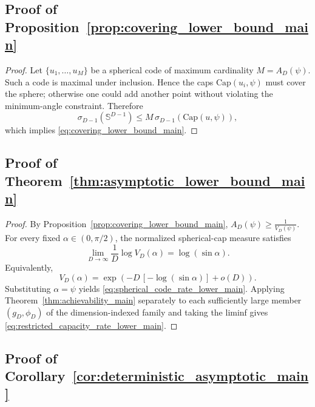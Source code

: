 \documentclass[journal]{IEEEtran}
\begin{document}
\begin{bibunit}
\subsection{Proof of Proposition~\ref{prop:covering_lower_bound_main}}
\label{app:proof_prop_covering_lower_bound}

\begin{proof}
%
Let $\{u_1,\ldots,u_M\}$ be a spherical code of maximum cardinality $M=A_D(\psi)$. Such a code is maximal under inclusion. Hence the caps $\mathrm{Cap}(u_i,\psi)$ must cover the sphere; otherwise one could add another point without violating the minimum-angle constraint. Therefore
\[
\sigma_{D-1}(\mathbb{S}^{D-1}) \le M\,\sigma_{D-1}(\mathrm{Cap}(u,\psi)),
\]
which implies \eqref{eq:covering_lower_bound_main}.
%
\end{proof}







\subsection{Proof of Theorem~\ref{thm:asymptotic_lower_bound_main}}
\label{app:proof_thm_asymptotic_lower_bound}


\begin{proof}
% 
By Proposition~\ref{prop:covering_lower_bound_main}, $A_D(\psi)\ge \frac{1}{V_D(\psi)}$. For every fixed $\alpha\in(0,\pi/2)$, the normalized spherical-cap measure satisfies
%
\begin{equation}
\lim_{D\to\infty}\frac{1}{D}\log V_D(\alpha)=\log(\sin\alpha).
\end{equation}
%
Equivalently,
%
\begin{equation}
V_D(\alpha) = \exp \left( -D\,[-\log(\sin\alpha)] + o(D) \right).
\end{equation}
%
Substituting $\alpha=\psi$ yields \eqref{eq:spherical_code_rate_lower_main}. Applying Theorem~\ref{thm:achievability_main} separately to each sufficiently large member $(g_D,\phi_D)$ of the dimension-indexed family and taking the liminf gives \eqref{eq:restricted_capacity_rate_lower_main}.
%
\end{proof}



\subsection{Proof of Corollary~\ref{cor:deterministic_asymptotic_main}}
\label{app:proof_cor_deterministic_asymptotic}


\end{bibunit}
\end{document}
